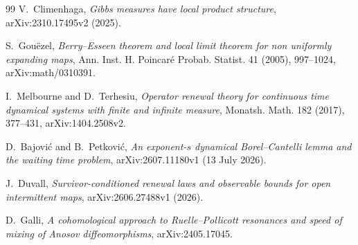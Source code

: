 \documentclass[11pt]{article}
\begin{document}
\begin{thebibliography}{99}
V.~Climenhaga,
\emph{Gibbs measures have local product structure},
arXiv:2310.17495v2 (2025).

S.~Gou\"ezel,
\emph{Berry--Esseen theorem and local limit theorem for non uniformly
expanding maps}, Ann. Inst. H. Poincar\'e Probab. Statist. 41 (2005),
997--1024, arXiv:math/0310391.

I.~Melbourne and D.~Terhesiu,
\emph{Operator renewal theory for continuous time dynamical systems with
finite and infinite measure}, Monatsh. Math. 182 (2017), 377--431,
arXiv:1404.2508v2.

D.~Bajovi\'c and B.~Petkovi\'c,
\emph{An exponent-$s$ dynamical Borel--Cantelli lemma and the waiting time
problem}, arXiv:2607.11180v1 (13 July 2026).

J.~Duvall,
\emph{Survivor-conditioned renewal laws and observable bounds for open
intermittent maps}, arXiv:2606.27488v1 (2026).

D.~Galli,
\emph{A cohomological approach to Ruelle--Pollicott resonances and speed of
mixing of Anosov diffeomorphisms}, arXiv:2405.17045.
\end{thebibliography}
\endgroup
\end{document}
